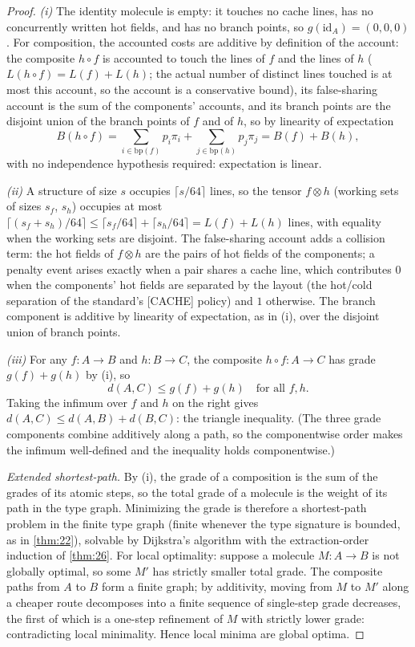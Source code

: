 \begin{proof}
\emph{(i)} The identity molecule is empty: it touches no cache lines,
has no concurrently written hot fields, and has no branch points, so
$g (\mathrm{id}_A) = (0,0,0)$. For composition, the accounted costs are
additive by definition of the account: the composite $h \circ f$ is
accounted to touch the lines of $f$ and the lines of $h$ ($L (h \circ f)
= L (f) + L (h)$; the actual number of distinct lines touched is at most
this account, so the account is a conservative bound), its false-sharing
account is the sum of the components' accounts, and its branch points
are the disjoint union of the branch points of $f$ and of $h$, so by
linearity of expectation
\[ B (h \circ f) = \sum_{i \in \mathrm{bp} (f)} p_i \pi_i +
\sum_{j \in \mathrm{bp} (h)} p_j \pi_j = B (f) + B (h), \]
with no independence hypothesis required: expectation is linear.

\emph{(ii)} A structure of size $s$ occupies $\lceil s/64 \rceil$ lines,
so the tensor $f \otimes h$ (working sets of sizes $s_f$, $s_h$)
occupies at most $\lceil (s_f + s_h)/64 \rceil \le \lceil s_f/64 \rceil +
\lceil s_h/64 \rceil = L (f) + L (h)$ lines, with equality when the
working sets are disjoint. The false-sharing account adds a collision
term: the hot fields of $f \otimes h$ are the pairs of hot fields of the
components; a penalty event arises exactly when a pair shares a cache
line, which contributes $0$ when the components' hot fields are
separated by the layout (the hot/cold separation of the standard's
[CACHE] policy) and $1$ otherwise. The branch component is additive by
linearity of expectation, as in (i), over the disjoint union of branch
points.

\emph{(iii)} For any $f \colon A \to B$ and $h \colon B \to C$, the
composite $h \circ f \colon A \to C$ has grade $g (f) + g (h)$ by (i), so
\[ d (A,C) \le g (f) + g (h) \quad\text{for all } f, h. \]
Taking the infimum over $f$ and $h$ on the right gives $d (A,C) \le
d (A,B) + d (B,C)$: the triangle inequality. (The three grade components
combine additively along a path, so the componentwise order makes the
infimum well-defined and the inequality holds componentwise.)

\emph{Extended shortest-path.} By (i), the grade of a composition is the
sum of the grades of its atomic steps, so the total grade of a molecule
is the weight of its path in the type graph. Minimizing the grade is
therefore a shortest-path problem in the finite type graph (finite
whenever the type signature is bounded, as in \ref{thm:22}), solvable by
Dijkstra's algorithm with the extraction-order induction of \ref{thm:26}.
For local optimality: suppose a molecule $M \colon A \to B$ is not
globally optimal, so some $M'$ has strictly smaller total grade. The
composite paths from $A$ to $B$ form a finite graph; by additivity,
moving from $M$ to $M'$ along a cheaper route decomposes into a finite
sequence of single-step grade decreases, the first of which is a
one-step refinement of $M$ with strictly lower grade: contradicting
local minimality. Hence local minima are global optima.
\end{proof}

